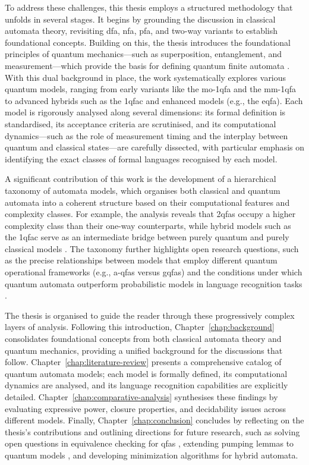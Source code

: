 To address these challenges, this thesis employs a structured methodology that unfolds in several stages. It begins by grounding the discussion in classical automata theory, revisiting \gls{dfa}, \gls{nfa}, \gls{pfa}, and two-way variants to establish foundational concepts. Building on this, the thesis introduces the foundational principles of quantum mechanics—such as superposition, entanglement, and measurement—which provide the basis for defining quantum finite automata \cite{nielsen2010quantum}. With this dual background in place, the work systematically explores various quantum models, ranging from early variants like the \gls{mo-1qfa} \cite{moore2000quantum} and the \gls{mm-1qfa} \cite{kondacs1997power} to advanced hybrids such as the \gls{1qfac} and enhanced models (e.g., the \gls{eqfa}). Each model is rigorously analysed along several dimensions: its formal definition is standardised, its acceptance criteria are scrutinised, and its computational dynamics—such as the role of measurement timing and the interplay between quantum and classical states—are carefully dissected, with particular emphasis on identifying the exact classes of formal languages recognised by each model.

A significant contribution of this work is the development of a hierarchical taxonomy of automata models, which organises both classical and quantum automata into a coherent structure based on their computational features and complexity classes. For example, the analysis reveals that \glspl{2qfa} occupy a higher complexity class than their one-way counterparts, while hybrid models such as the \gls{1qfac} serve as an intermediate bridge between purely quantum and purely classical models \cite{yakaryilmaz2010succinctness}. The taxonomy further highlights open research questions, such as the precise relationships between models that employ different quantum operational frameworks (e.g., \glspl{a-qfa} versus \glspl{gqfa}) and the conditions under which quantum automata outperform probabilistic models in language recognition tasks \cite{hirvensalo2012quantum}.

The thesis is organised to guide the reader through these progressively complex layers of analysis. Following this introduction, Chapter~\ref{chap:background} consolidates foundational concepts from both classical automata theory and quantum mechanics, providing a unified background for the discussions that follow. Chapter~\ref{chap:literature-review} presents a comprehensive catalog of quantum automata models; each model is formally defined, its computational dynamics are analysed, and its language recognition capabilities are explicitly detailed. Chapter~\ref{chap:comparative-analysis} synthesises these findings by evaluating expressive power, closure properties, and decidability issues across different models. Finally, Chapter~\ref{chap:conclusion} concludes by reflecting on the thesis’s contributions and outlining directions for future research, such as solving open questions in equivalence checking for \glspl{qfa} \cite{li2012characterizations}, extending pumping lemmas to quantum models \cite{yakaryilmaz2014quantum}, and developing minimization algorithms for hybrid automata.

